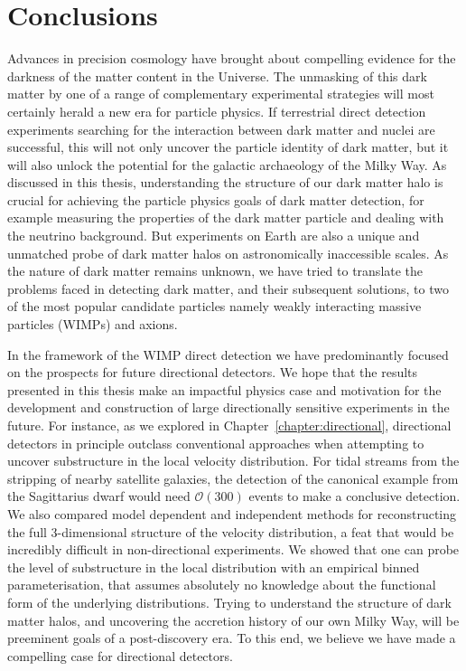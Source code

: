 \chapter{Conclusions}
Advances in precision cosmology have brought about compelling evidence for the darkness of the matter content in the Universe. The unmasking of this dark matter by one of a range of complementary experimental strategies will most certainly herald a new era for particle physics. If terrestrial direct detection experiments searching for the interaction between dark matter and nuclei are successful, this will not only uncover the particle identity of dark matter, but it will also unlock the potential for the galactic archaeology of the Milky Way. As discussed in this thesis, understanding the structure of our dark matter halo is crucial for achieving the particle physics goals of dark matter detection, for example measuring the properties of the dark matter particle and dealing with the neutrino background. But experiments on Earth are also a unique and unmatched probe of dark matter halos on astronomically inaccessible scales. As the nature of dark matter remains unknown, we have tried to translate the problems faced in detecting dark matter, and their subsequent solutions, to two of the most popular candidate particles namely weakly interacting massive particles (WIMPs) and axions. 

In the framework of the WIMP direct detection we have predominantly focused on the prospects for future directional detectors. We hope that the results presented in this thesis make an impactful physics case and motivation for the development and construction of large directionally sensitive experiments in the future. For instance, as we explored in Chapter~\ref{chapter:directional}, directional detectors in principle outclass conventional approaches when attempting to uncover substructure in the local velocity distribution. For tidal streams from the stripping of nearby satellite galaxies, the detection of the canonical example from the Sagittarius dwarf would need $\mathcal{O}(300)$ events to make a conclusive detection. We also compared model dependent and independent methods for reconstructing the full 3-dimensional structure of the velocity distribution, a feat that would be incredibly difficult in non-directional experiments. We showed that one can probe the level of substructure in the local distribution with an empirical binned parameterisation, that assumes absolutely no knowledge about the functional form of the underlying distributions. Trying to understand the structure of dark matter halos, and uncovering the accretion history of our own Milky Way, will be preeminent goals of a post-discovery era. To this end, we believe we have made a compelling case for directional detectors.

